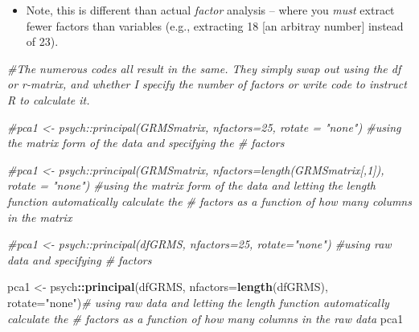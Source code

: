 \documentclass[
  english,
]{book}
\newenvironment{Shaded}{\begin{snugshade}}{\end{snugshade}}
\newcommand{\CommentTok}[1]{\textcolor[rgb]{0.56,0.35,0.01}{\textit{#1}}}
\newcommand{\DataTypeTok}[1]{\textcolor[rgb]{0.13,0.29,0.53}{#1}}
\newcommand{\KeywordTok}[1]{\textcolor[rgb]{0.13,0.29,0.53}{\textbf{#1}}}
\newcommand{\NormalTok}[1]{#1}
\newcommand{\OperatorTok}[1]{\textcolor[rgb]{0.81,0.36,0.00}{\textbf{#1}}}
\newcommand{\StringTok}[1]{\textcolor[rgb]{0.31,0.60,0.02}{#1}}
\providecommand{\tightlist}{%
  \setlength{\itemsep}{0pt}\setlength{\parskip}{0pt}}
\begin{document}
\begin{itemize}
\tightlist
\item
  Note, this is different than actual \emph{factor} analysis -- where you \emph{must} extract fewer factors than variables (e.g., extracting 18 {[}an arbitray number{]} instead of 23).
\end{itemize}

\begin{Shaded}
\begin{Highlighting}[]
\CommentTok{#The numerous codes  all result in the same. They simply swap out using the df or r-matrix, and whether I specify the number of factors or write code to instruct R to calculate it.}

\CommentTok{#pca1 <- psych::principal(GRMSmatrix, nfactors=25, rotate = "none") #using the matrix form of the data and specifying the # factors}

\CommentTok{#pca1 <- psych::principal(GRMSmatrix, nfactors=length(GRMSmatrix[,1]), rotate = "none") #using the matrix form of the data and letting the length function automatically calculate the # factors as a function of how many columns in the matrix}

\CommentTok{#pca1 <- psych::principal(dfGRMS, nfactors=25, rotate="none") #using raw data and specifying # factors}

\NormalTok{pca1 <-}\StringTok{ }\NormalTok{psych}\OperatorTok{::}\KeywordTok{principal}\NormalTok{(dfGRMS, }\DataTypeTok{nfactors=}\KeywordTok{length}\NormalTok{(dfGRMS), }\DataTypeTok{rotate=}\StringTok{"none"}\NormalTok{)}\CommentTok{# using raw data and letting the length function automatically calculate the # factors as a function of how many columns in the raw data}
\NormalTok{pca1}
\end{Highlighting}
\end{Shaded}
\end{document}
